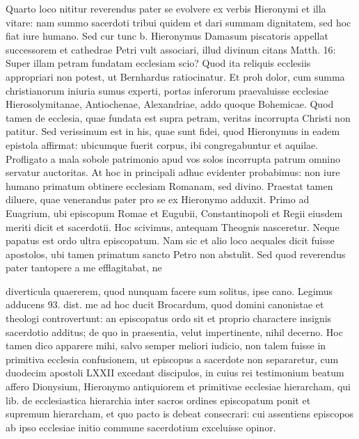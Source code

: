 Quarto loco nititur reverendus pater se evolvere ex verbis Hieronymi et illa vitare: nam summo sacerdoti tribui quidem et dari summam dignitatem, sed hoc fiat iure humano. Sed cur tunc b. Hieronymus Damasum piscatoris appellat successorem et cathedrae Petri vult associari, illud divinum citans Matth. 16: Super illam petram fundatam ecclesiam scio? Quod ita reliquis ecclesiis appropriari non potest, ut Bernhardus ratiocinatur. Et proh dolor, cum summa christianorum iniuria sumus experti, portas inferorum praevaluisse ecclesiae Hierosolymitanae, Antiochenae, Alexandriae, addo quoque Bohemicae. Quod tamen de ecclesia, quae fundata est supra petram, veritas incorrupta Christi non patitur. Sed verissimum est in his, quae sunt fidei, quod Hieronymus in eadem epistola affirmat: ubicumque fuerit corpus, ibi congregabuntur et aquilae. Profligato a mala sobole patrimonio apud vos solos incorrupta patrum omnino servatur auctoritas. At hoc in principali adhuc evidenter probabimus: non iure humano primatum obtinere ecclesiam Romanam, sed divino. Praestat tamen diluere, quae venerandus pater pro se ex Hieronymo adduxit. Primo ad Euagrium, ubi episcopum Romae et Eugubii, Constantinopoli et Regii eiusdem meriti dicit et sacerdotii. Hoc scivimus, antequam Theognis nasceretur. Neque papatus est ordo ultra episcopatum. Nam sic et alio loco aequales dicit fuisse apostolos, ubi tamen primatum sancto Petro non abstulit. Sed quod reverendus pater tantopere a me efflagitabat, ne

diverticula quaererem, quod nunquam facere sum solitus, ipse cano. Legimus adducens 93. dist. me ad hoc ducit Brocardum, quod domini canonistae et theologi controvertunt: an episcopatus ordo sit et proprio charactere insignis sacerdotio additus; de quo in praesentia, velut impertinente, nihil decerno. Hoc tamen dico apparere mihi, salvo semper meliori iudicio, non talem fuisse in primitiva ecclesia confusionem, ut episcopus a sacerdote non separaretur, cum duodecim apostoli LXXII excedant discipulos, in cuius rei testimonium beatum affero Dionysium, Hieronymo antiquiorem et primitivae ecclesiae hierarcham, qui lib. de ecclesiastica hierarchia inter sacros ordines episcopatum ponit et supremum hierarcham, et quo pacto is debeat consecrari: cui assentiens episcopos ab ipso ecclesiae initio commune sacerdotium exceluisse opinor.

